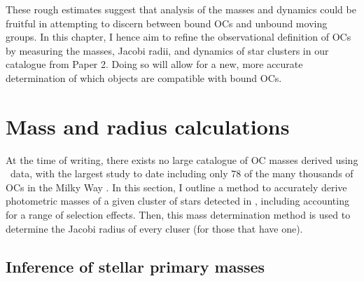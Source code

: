 These rough estimates suggest that analysis of the masses and dynamics could be fruitful in attempting to discern between bound OCs and unbound moving groups. In this chapter, I hence aim to refine the observational definition of OCs by measuring the masses, Jacobi radii, and dynamics of star clusters in our catalogue from Paper 2. Doing so will allow for a new, more accurate determination of which objects are compatible with bound OCs. 




\section{Mass and radius calculations}
\label{sec:dynamics:masses}

At the time of writing, there exists no large catalogue of OC masses derived using \gaia\ data, with the largest study to date including only 78 of the many thousands of OCs in the Milky Way \citep{cordoni_photometric_binaries_2023}. In this section, I outline a method to accurately derive photometric masses of a given cluster of stars detected in \gaia, including accounting for a range of selection effects. Then, this mass determination method is used to determine the Jacobi radius of every cluser (for those that have one).


\subsection{Inference of stellar primary masses}
\label{sec:dynamics:masses:isochrones}

